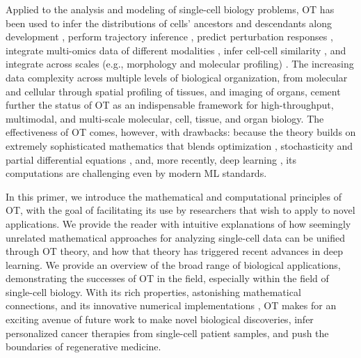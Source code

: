 Applied to the analysis and modeling of single-cell biology problems, OT has been used to infer the distributions of cells' ancestors and descendants along development \citep{schiebinger2019optimal}, perform trajectory inference \citep{bunne2022proximal, forrow2021lineageot, bunne2022recovering, lavenant2021towards, schiebinger2019optimal, tong2020trajectorynet, yang2020predicting, zhang2021optimal, chizat2022trajectory}, predict perturbation responses \citep{bunne2021learning, yang2018scalable, lubeck2022neural}, integrate multi-omics data of different modalities \citep{demetci2022scot}, infer cell-cell similarity \citep{huizing2022optimal}, and integrate across scales (e.g., morphology and molecular profiling) \citep{yang2021multi}. The increasing data complexity across multiple levels of biological organization, from molecular and cellular through spatial profiling \citep{moriel2021novosparc} of tissues, and imaging of organs, cement further the status of OT as an indispensable framework for high-throughput, multimodal, and multi-scale molecular, cell, tissue, and organ biology. The effectiveness of OT comes, however, with drawbacks: because the theory builds on extremely sophisticated mathematics that blends optimization \citep{cuturi2013sinkhorn, cuturi2022optimal}, stochasticity \citep{chizat2022trajectory, bunne2022recovering} and partial differential equations \citep{bunne2022proximal}, and, more recently, deep learning \citep{tong2020trajectorynet, bunne2021learning, bunne2022supervised, yang2018scalable, lubeck2022neural, yang2021multi}, its computations are challenging even by modern ML standards.


In this primer, we introduce the mathematical and computational principles of OT, with the goal of facilitating its use by researchers that wish to apply to novel applications. We provide the reader with intuitive explanations of how seemingly unrelated mathematical approaches for analyzing single-cell data can be unified through OT theory, and how that theory has triggered recent advances in deep learning. We provide an overview of the broad range of biological applications, demonstrating the successes of OT in the field, especially within the field of single-cell biology. With its rich properties, astonishing mathematical connections, and its innovative numerical implementations \citep{cuturi2022optimal}, OT makes for an exciting avenue of future work to make novel biological discoveries, infer personalized cancer therapies from single-cell patient samples, and push the boundaries of regenerative medicine.

